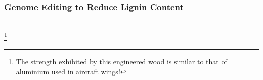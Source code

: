\documentclass[xcolor=dvipsnames]{beamer}
\newcommand\blfootnote[1]{%
	\begingroup
	\renewcommand\thefootnote{}\footnote{#1}%
	\addtocounter{footnote}{-1}%
	\endgroup
}
\begin{document}
\begin{frame}
	\frametitle{Genome Editing to Reduce Lignin Content}
	
						\\
\blfootnote{ The strength exhibited by this engineered wood is similar to that of aluminium used in aircraft wings!}
\end{frame}
\end{document}
